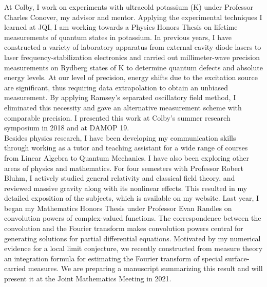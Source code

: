 \documentclass[12pt]{article}
\begin{document}
At Colby, I work on experiments with ultracold potassium (K) under Professor Charles Conover, my advisor and mentor. Applying the experimental techniques I learned at JQI, I am working towards a Physics Honors Thesis on lifetime measurements of quantum states in potassium. In previous years, I have constructed a variety of laboratory apparatus from external cavity diode lasers to laser frequency-stabilization electronics and carried out millimeter-wave precision measurements on Rydberg states of K to determine quantum defects and absolute energy levels. At our level of precision, energy shifts due to the excitation source are significant, thus requiring data extrapolation to obtain an unbiased measurement. By applying Ramsey's separated oscillatory field method, I eliminated this necessity and gave an alternative measurement scheme with comparable precision. I presented this work at Colby's summer research symposium in 2018 and at DAMOP 19.  \\

Besides physics research, I have been developing my communication skills through working as a tutor and teaching assistant for a wide range of courses from Linear Algebra to Quantum Mechanics. I have also been exploring other areas of physics and mathematics. For four semesters with Professor Robert Bluhm, I actively studied general relativity and classical field theory, and reviewed massive gravity along with its nonlinear effects. This resulted in my detailed exposition of the subjects, which is available on my website. Last year, I began my Mathematics Honors Thesis under Professor Evan Randles on convolution powers of complex-valued functions. The correspondence between the convolution and the Fourier transform makes convolution powers central for generating solutions for partial differential equations. Motivated by my numerical evidence for a local limit conjecture, we recently constructed from measure theory an integration formula for estimating the Fourier transform of special surface-carried measures. We are preparing a manuscript summarizing this result and will present it at the Joint Mathematics Meeting in 2021. \\ 
\end{document}

